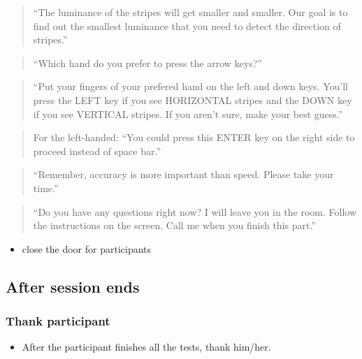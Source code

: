 \documentclass[]{article}
\providecommand{\tightlist}{%
  \setlength{\itemsep}{0pt}\setlength{\parskip}{0pt}}
\begin{document}
\begin{quote}
``The luminance of the stripes will get smaller and smaller. Our goal is
to find out the smallest luminance that you need to detect the direction
of stripes.''
\end{quote}

\begin{quote}
``Which hand do you prefer to press the arrow keys?''
\end{quote}

\begin{quote}
``Put your fingers of your prefered hand on the left and down keys.
You'll press the LEFT key if you see HORIZONTAL stripes and the DOWN key
if you see VERTICAL stripes. If you aren't sure, make your best guess.''
\end{quote}

\begin{quote}
For the left-handed: ``You could press this ENTER key on the right side
to proceed instead of space bar.''
\end{quote}

\begin{quote}
``Remember, accuracy is more important than speed. Please take your
time.''
\end{quote}

\begin{quote}
``Do you have any questions right now? I will leave you in the room.
Follow the instructions on the screen. Call me when you finish this
part.''
\end{quote}

\begin{itemize}
\tightlist
\item
  close the door for participants
\end{itemize}

\subsection{After session ends}\label{after-session-ends}

\subsubsection{Thank participant}\label{thank-participant}

\begin{itemize}
\tightlist
\item
  After the participant finishes all the tests, thank him/her.
\end{itemize}
\end{document}
